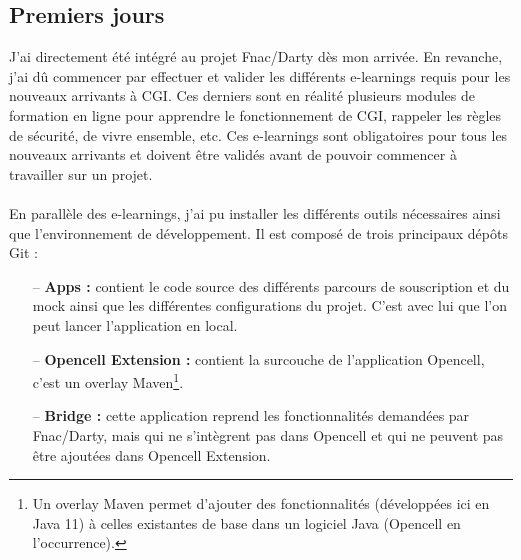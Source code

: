 \documentclass[12pt, a4paper]{report}
\begin{document}
	\subsection{Premiers jours}

	J'ai directement été intégré au projet Fnac/Darty dès mon arrivée. En revanche, j'ai dû commencer par effectuer et valider les différents e-learnings requis pour les nouveaux arrivants à CGI. Ces derniers sont en réalité plusieurs modules de formation en ligne pour apprendre le fonctionnement de CGI, rappeler les règles de sécurité, de vivre ensemble, etc. Ces e-learnings sont obligatoires pour tous les nouveaux arrivants et doivent être validés avant de pouvoir commencer à travailler sur un projet.
	\\\\
	En parallèle des e-learnings, j'ai pu installer les différents outils nécessaires ainsi que l'environnement de développement. Il est composé de trois principaux dépôts Git :
	\\
	\begin{itemize}
		\item[–] \textbf{Apps :} contient le code source des différents parcours de souscription et du mock ainsi que les différentes configurations du projet. C'est avec lui que l'on peut lancer l'application en local.
		\item[–] \textbf{Opencell Extension :} contient la surcouche de l'application Opencell, c'est un overlay Maven\footnote{Un overlay Maven permet d'ajouter des fonctionnalités (développées ici en Java 11) à celles existantes de base dans un logiciel Java (Opencell en l'occurrence).}.
		\item[–] \textbf{Bridge :} cette application reprend les fonctionnalités demandées par Fnac/Darty, mais qui ne s'intègrent pas dans Opencell et qui ne peuvent pas être ajoutées dans Opencell Extension.\\
	\end{itemize}
\end{document}
